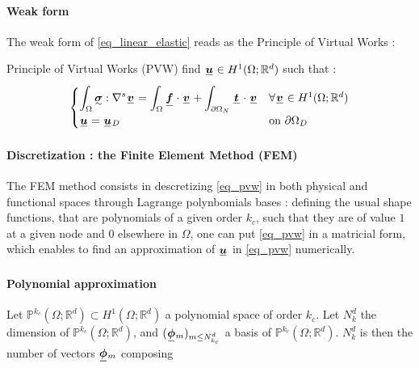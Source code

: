 \documentclass[fleqn]{article}
\newcommand{\Hone}{
  H^{1}(\Omega; \mathbb{R}^{d})
}
\begin{document}
    \paragraph{Weak form}

      The weak form of \eqref{eq_linear_elastic} reads as the Principle of Virtual Works :

      \begin{theorembox}{Principle of Virtual Works (PVW)}
        find $\tensori{u} \in \Hone$ such that : 
        \begin{equation}
          \begin{cases}
            \displaystyle
            \int_{\Omega} \tensorii{\sigma} : \nabla^s \tensori{v} = \int_{\Omega} \tensori{f} \cdot \tensori{v} + \int_{\partial \Omega_N} \tensori{t} \cdot \tensori{v} &  \forall \tensori{v} \in \Hone
            \\
            \tensori{u} = \tensori{u} \subscript{D} & \mbox{on } \partial \Omega_D
          \end{cases}
        \end{equation}
        \label{eq_pvw}
      \end{theorembox}

    \paragraph{Discretization : the Finite Element Method (FEM)}

      The FEM method consists in descretizing \eqref{eq_pvw} in both physical and functional spaces through Lagrange polynbomials bases : defining the usual shape functions, that are polynomials of a given order $k_c$, such that they are of value $1$ at a given node and $0$ elsewhere in $\Omega$, one can put \eqref{eq_pvw} in a matricial form, which enables to find an approximation of $\tensori{u}$ in \eqref{eq_pvw} numerically.
    
    \paragraph{Polynomial approximation}

      Let $\mathbb{P}^{k_c}(\Omega;\mathbb{R}^d) \subset \Hone$ a polynomial space of order $k_c$. Let $N_k^d$ the dimension of $\mathbb{P}^{k_c}(\Omega;\mathbb{R}^d)$, and $(\tensori{\phi}\subscript{m})_{m \leq N_{k_c}^d}$ a basis of $\mathbb{P}^{k_c}(\Omega;\mathbb{R}^d)$. $N_k^d$ is then the number of vectors $\tensori{\phi}\subscript{m}$ composing 

    

  
  
\end{document}
